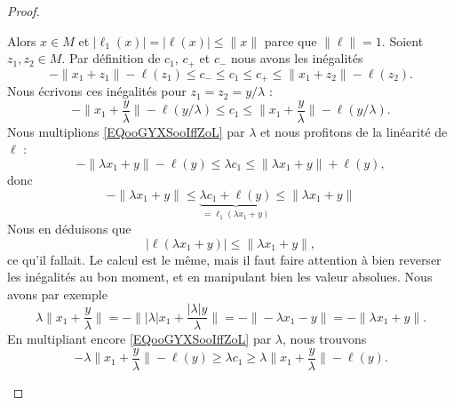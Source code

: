 \begin{proof}
\begin{subproof}
        \begin{subproof}
            \spitem[Si \( \lambda=0\)]
            Alors \( x\in M\) et \( |\ell_1(x)|=|\ell(x)|\leq \| x \|\) parce que \( \| \ell \|=1\).
            Soient \( z_1,z_2\in M\). Par définition de \( c_1\), \( c_+\) et \( c_-\) nous avons les inégalités
            \begin{equation}
                -\| x_1+z_1 \|-\ell(z_1)\leq c_-\leq c_1\leq c_+\leq \| x_1+z_2 \|-\ell(z_2).
            \end{equation}
            Nous écrivons ces inégalités pour \( z_1=z_2=y/\lambda\) :
            \begin{equation}        \label{EQooGYXSooIffZoL}
                -\| x_1+\frac{ y }{ \lambda } \|-\ell(y/\lambda)\leq c_1\leq \| x_1+\frac{ y }{ \lambda } \|-\ell(y/\lambda).
            \end{equation}
            \spitem[Si \( \lambda>0\)]
            Nous multiplions \eqref{EQooGYXSooIffZoL} par \( \lambda\) et nous profitons de la linéarité de \( \ell\) :
            \begin{equation}
                -\| \lambda x_1+y \|-\ell(y)\leq \lambda c_1\leq \| \lambda x_1+y \|+\ell(y),
            \end{equation}
            donc
            \begin{equation}        \label{EQooYRULooBebNTq}
                -\| \lambda x_1+y \|\leq \underbrace{\lambda c_1+\ell(y)}_{=\ell_1(\lambda x_1+y)}\leq \| \lambda x_1+y \|
            \end{equation}
            Nous en déduisons que
            \begin{equation}
                | \ell(\lambda x_1+y) |\leq \| \lambda x_1+y \|,
            \end{equation}
            ce qu'il fallait.
            \spitem[Si \( \lambda<0\)]
            Le calcul est le même, mais il faut faire attention à bien reverser les inégalités au bon moment, et en manipulant bien les valeur absolues. Nous avons par exemple
            \begin{equation}
                \lambda\|  x_1+\frac{ y }{ \lambda } \|=-\big\| | \lambda |x_1+\frac{ | \lambda |y }{ \lambda } \big\|=-\| -\lambda x_1-y \|=-\| \lambda x_1+y \|.
            \end{equation}
            En multipliant encore \eqref{EQooGYXSooIffZoL} par \( \lambda\), nous trouvons
            \begin{equation}
                -\lambda\| x_1+\frac{ y }{ \lambda } \|-\ell(y)\geq \lambda c_1\geq \lambda\| x_1+\frac{ y }{ \lambda } \|-\ell(y).

\end{equation}
\end{subproof}
\end{subproof}
\end{proof}
